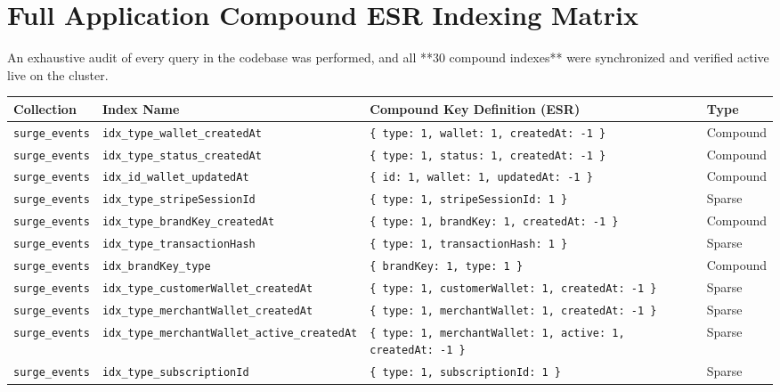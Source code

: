\documentclass[11pt,a4paper]{article}
\begin{document}
\section{Full Application Compound ESR Indexing Matrix}

An exhaustive audit of every query in the codebase was performed, and all **30 compound indexes** were synchronized and verified active live on the cluster.

\begin{center}
\small
\begin{longtable}{p{3.2cm}p{6.8cm}p{5.2cm}p{1.8cm}}
\toprule
\textbf{Collection} & \textbf{Index Name} & \textbf{Compound Key Definition (ESR)} & \textbf{Type} \\
\midrule
\endhead
\bottomrule
\endfoot
\texttt{surge\_events} & \texttt{idx\_type\_wallet\_createdAt} & \texttt{\{ type: 1, wallet: 1, createdAt: -1 \}} & Compound \\
\texttt{surge\_events} & \texttt{idx\_type\_status\_createdAt} & \texttt{\{ type: 1, status: 1, createdAt: -1 \}} & Compound \\
\texttt{surge\_events} & \texttt{idx\_id\_wallet\_updatedAt} & \texttt{\{ id: 1, wallet: 1, updatedAt: -1 \}} & Compound \\
\texttt{surge\_events} & \texttt{idx\_type\_stripeSessionId} & \texttt{\{ type: 1, stripeSessionId: 1 \}} & Sparse \\
\texttt{surge\_events} & \texttt{idx\_type\_brandKey\_createdAt} & \texttt{\{ type: 1, brandKey: 1, createdAt: -1 \}} & Compound \\
\texttt{surge\_events} & \texttt{idx\_type\_transactionHash} & \texttt{\{ type: 1, transactionHash: 1 \}} & Sparse \\
\texttt{surge\_events} & \texttt{idx\_brandKey\_type} & \texttt{\{ brandKey: 1, type: 1 \}} & Compound \\
\texttt{surge\_events} & \texttt{idx\_type\_customerWallet\_createdAt} & \texttt{\{ type: 1, customerWallet: 1, createdAt: -1 \}} & Sparse \\
\texttt{surge\_events} & \texttt{idx\_type\_merchantWallet\_createdAt} & \texttt{\{ type: 1, merchantWallet: 1, createdAt: -1 \}} & Sparse \\
\texttt{surge\_events} & \texttt{idx\_type\_merchantWallet\_active\_createdAt} & \texttt{\{ type: 1, merchantWallet: 1, active: 1, createdAt: -1 \}} & Sparse \\
\texttt{surge\_events} & \texttt{idx\_type\_subscriptionId} & \texttt{\{ type: 1, subscriptionId: 1 \}} & Sparse \\

\end{longtable}
\end{center}
\end{document}
